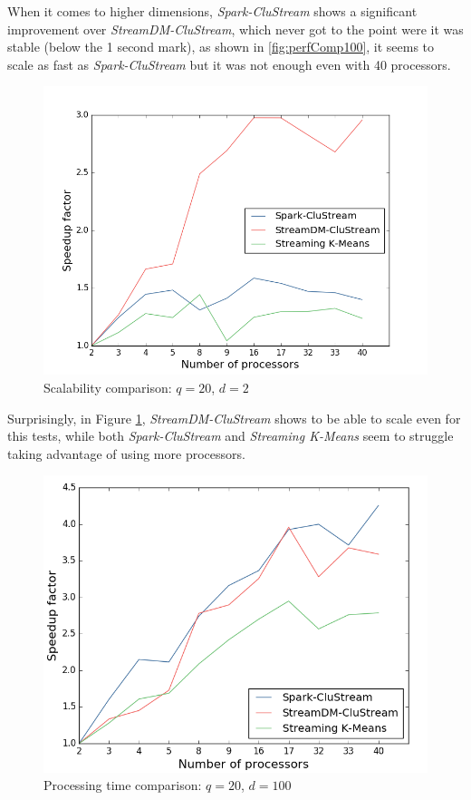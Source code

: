 \documentclass{llncs}
\begin{document}
When it comes to higher dimensions, \textit{Spark-CluStream} shows a significant improvement over \textit{StreamDM-CluStream}, which never got to the point were it was stable (below the 1 second mark), as shown in \ref{fig:perfComp100}, it seems to scale as fast as \textit{Spark-CluStream} but it was not enough even with 40 processors. 


\begin{figure}[h!]
 \centering
 \includegraphics[scale=0.47]{./styles/scalComp2.png}
 \caption{Scalability comparison: $q=20$, $d=2$}
 \label{fig:scalComp2}
\end{figure}

Surprisingly, in Figure \ref{fig:scalComp2}, \textit{StreamDM-CluStream} shows to be able to scale even for this tests, while both \textit{Spark-CluStream} and \textit{Streaming K-Means} seem to struggle taking advantage of using more processors.

\begin{figure}[h!]
 \centering
 \includegraphics[scale=0.47]{./styles/scalComp100.png}
 \caption{Processing time comparison: $q=20$, $d=100$}
 \label{fig:scalComp100}
\end{figure}
\end{document}
